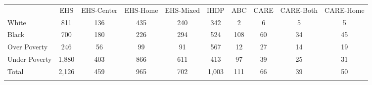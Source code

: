 \begin{tabular}{lccccccccc}
\hline \noalign{\smallskip} & EHS & EHS-Center & EHS-Home & EHS-Mixed & IHDP & ABC & CARE & CARE-Both & CARE-Home\\
\noalign{\smallskip}\hline \noalign{\smallskip}White & 811 & 136 & 435 & 240 & 342 & 2 & 6 & 5 & 5\\
Black & 700 & 180 & 226 & 294 & 524 & 108 & 60 & 34 & 45\\
Over Poverty & 246 & 56 & 99 & 91 & 567 & 12 & 27 & 14 & 19\\
Under Poverty & 1,880 & 403 & 866 & 611 & 413 & 97 & 39 & 25 & 31\\
Total & 2,126 & 459 & 965 & 702 & 1,003 & 111 & 66 & 39 & 50\\
\noalign{\smallskip}\hline\end{tabular}\\
